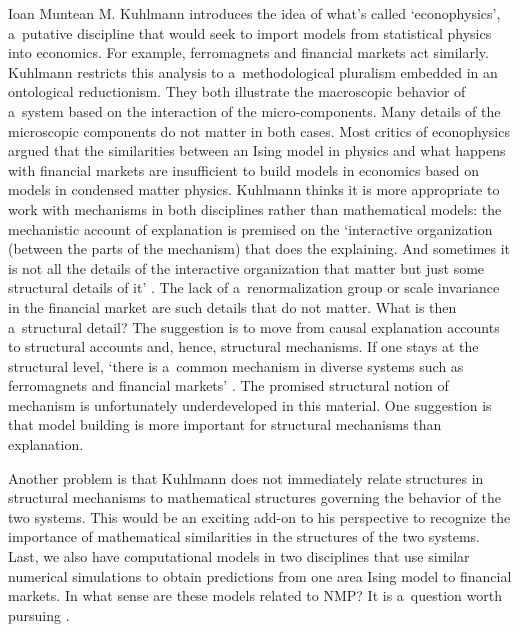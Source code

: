 \begin{recengenv}{Ioan Muntean}
\enlargethispage{1.5\baselineskip}
M. Kuhlmann introduces the idea of what's called ‘econophysics', a~putative discipline that would seek to import models from statistical physics into economics. For example, ferromagnets and financial markets act similarly. Kuhlmann restricts this analysis to a~methodological pluralism embedded in an ontological reductionism. They both illustrate the macroscopic behavior of a~system based on the interaction of the micro-components. Many details of the microscopic components do not matter in both cases. Most critics of econophysics argued that the similarities between an Ising model in physics and what happens with financial markets are insufficient to build models in economics based on models in condensed matter physics. Kuhlmann thinks it is more appropriate to work with mechanisms in both disciplines rather than mathematical models: the mechanistic account of explanation is premised on the ‘interactive organization (between the parts of the mechanism) that does the explaining. And sometimes it is not all the details of the interactive organization that matter but just some structural details of it'
\parencite*[][p.195]{falkenburg_mechanistic_2019}. %
 The lack of a~renormalization group or scale invariance in the financial market are such details that do not matter. What is then a~structural detail? The suggestion is to move from causal explanation accounts to structural accounts and, hence, structural mechanisms. If one stays at the structural level, ‘there is a~common mechanism in diverse systems such as ferromagnets and financial markets' 
\parencite*[][p.198]{falkenburg_mechanistic_2019}. %
 The promised structural notion of mechanism is unfortunately underdeveloped in this material. One suggestion is that model building is more important for structural mechanisms than explanation.

Another problem is that Kuhlmann does not immediately relate structures in structural mechanisms to mathematical structures governing the behavior of the two systems. This would be an exciting add-on to his perspective to recognize the importance of mathematical similarities in the structures of the two systems. Last, we also have computational models in two disciplines that use similar numerical simulations to obtain predictions from one area Ising model to financial markets. In what sense are these models related to NMP? It is a~question worth pursuing
\parencite[see a~possible connection in][]{humphreys_knowledge_2019}.%



\end{recengenv}
